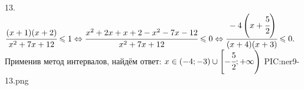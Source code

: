 13. $\cfrac{(x+1)(x+2)}{x^2+7x+12}\leqslant1 \Leftrightarrow \cfrac{x^2+2x+x+2-x^2-7x-12}{x^2+7x+12}\leqslant0 \Leftrightarrow
\cfrac{-4\left(x+\cfrac{5}{2}\right)}{(x+4)(x+3)}\leqslant0.$ Применив метод интервалов, найдём ответ: $x\in(-4;-3)\cup\left[-\cfrac{5}{2};+\infty\right)$
{{PIC:ner9-13.png}}\\
